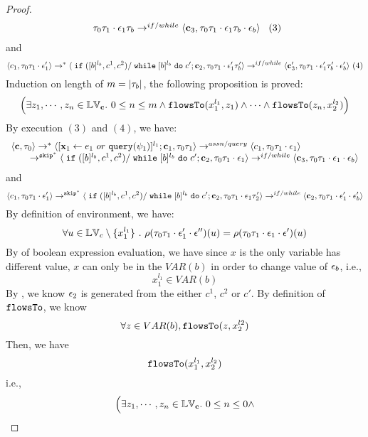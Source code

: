 \begin{proof}
\[\begin{array}{l}
{  \ensuremath{\mathtt{\tau}}_0 \ensuremath{\mathtt{\tau}}_1 \cdot \ensuremath{\mathtt{\epsilon}}_1 \ensuremath{\mathtt{\tau}}_b} 
  \rightarrow^{if / while} 
  \langle {\boldsymbol{\mathbf{c}}}_3,  \mathtt{\tau}_0 \mathtt{\tau}_1 \cdot \mathtt{\epsilon}_1 \mathtt{\tau}_b \cdot \mathtt{\epsilon}_b \rangle 
\end{array} ~ (3)
 \]
and 
 \[
  \langle c_1, \mathtt{\tau}_0 \mathtt{\tau}_1 \cdot \mathtt{\epsilon}_1' \rangle 
  \rightarrow^{*} 
  \langle \;\mathtt{if}\;([b]{}^{l_b}, c^1, c^2) / \;\mathtt{while}\; [b]{}^{l_b} \;\mathtt{do}\; c'; {\boldsymbol{\mathbf{c}}}_2, 
  \mathtt{\tau}_0 \mathtt{\tau}_1 \cdot \mathtt{\epsilon}_1' \mathtt{\tau}_b' \rangle 
  \rightarrow^{if/while} 
  \langle {\boldsymbol{\mathbf{c}}}_3',  \mathtt{\tau}_0 \mathtt{\tau}_1 \cdot \mathtt{\epsilon}_1' \mathtt{\tau}_b' \cdot \mathtt{\epsilon}_b' \rangle 
  ~(4)
 \]
Induction on length of $m = |\mathtt{\tau}_b|$, the following proposition is proved:
%
 \[
 \Big( \exists z_1, \cdots, z_n \in \mathbb{LV}_{{\boldsymbol{\mathbf{c}}}}. ~ 0 \leq n \leq m \land
  \mathtt{flowsTo}(x_1^{l_1}, z_1) 
  \land \cdots \land \mathtt{flowsTo}(z_n, x_2^{l_2}) \Big)
  \]
 By execution $(3)$ and $(4)$, we have:
\[
  \begin{array}{l}   
  \langle {\boldsymbol{\mathbf{c}}}, \mathtt{\tau}_0 \rangle 
  \rightarrow^{*} 
  \langle [\mathrel{ {\boldsymbol{\mathbf{x}}}_1 \leftarrow e_1~ or ~ {\tt query}(\psi_1) }]^{l_1} ; {\boldsymbol{\mathbf{c}}}_1, \mathtt{\tau}_0 \mathtt{\tau}_1 \rangle  \rightarrow^{assn/query}
 \langle c_1, \mathtt{\tau}_0 \mathtt{\tau}_1 \cdot \mathtt{\epsilon}_1 \rangle 
  \\ 
  \qquad \rightarrow^{\mathtt{skip}^*} 
  \langle \;\mathtt{if}\;([b]{}^{l_b}, c^1, c^2) / \;\mathtt{while}\; [b]{}^{l_b} \;\mathtt{do}\; c'; {\boldsymbol{\mathbf{c}}}_2, 
  \mathtt{\tau}_0 \mathtt{\tau}_1 \cdot \mathtt{\epsilon}_1 \rangle 
  \rightarrow^{if / while} 
  \langle {\boldsymbol{\mathbf{c}}}_3,  \mathtt{\tau}_0 \mathtt{\tau}_1 \cdot \mathtt{\epsilon}_1 \cdot \mathtt{\epsilon}_b \rangle 
\end{array}
 \]
and 
 \[
  \langle c_1, \mathtt{\tau}_0 \mathtt{\tau}_1 \cdot \mathtt{\epsilon}_1' \rangle 
  \rightarrow^{\mathtt{skip}^*} 
  \langle \;\mathtt{if}\;([b]{}^{l_b}, c^1, c^2) / \;\mathtt{while}\; [b]{}^{l_b} \;\mathtt{do}\; c'; {\boldsymbol{\mathbf{c}}}_2, 
  \mathtt{\tau}_0 \mathtt{\tau}_1 \cdot \mathtt{\epsilon}_1 \mathtt{\tau}_2' \rangle 
  \rightarrow^{if / while} 
  \langle {\boldsymbol{\mathbf{c}}}_2,  \mathtt{\tau}_0 \mathtt{\tau}_1 \cdot \mathtt{\epsilon}_1' \cdot \mathtt{\epsilon}_b' \rangle 
 \]
 By definition of environment, we have:
\[
  \forall u \in \mathbb{LV}_c \setminus \{x_1^{l_1}\} ~.~
  \rho(\mathtt{\tau}_0 \mathtt{\tau}_1 \cdot \mathtt{\epsilon}_1' \cdot \mathtt{\epsilon}'') (u) =  
  \rho(\mathtt{\tau}_0 \mathtt{\tau}_1 \cdot \mathtt{\epsilon}_1 \cdot \mathtt{\epsilon}') (u)
\]
%
By  of boolean expression evaluation, we have since $x$ is the only variable has different value, $x$ can only be in the $VAR(b)$ in order to change value of $\mathtt{\epsilon}_b$, i.e.,
 \[
  x_1^{l_1} \in VAR(b)
 \]
 By , we know $\mathtt{\epsilon}_2$ is generated from the either $c^1$, $c^2$ or $c'$.
 By definition of $\mathtt{flowsTo}$, we know
 \[
 \forall z \in VAR(b), \mathtt{flowsTo}(z, x_2^{l2})
 \]
 Then, we have
 \[
 \mathtt{flowsTo}(x_1^{l_1}, x_2^{l_2})
 \]
 i.e.,
 \[
 \Big( \exists z_1, \cdots, z_n \in \mathbb{LV}_{{\boldsymbol{\mathbf{c}}}}. ~ 0 \leq n \leq 0 \land
\]
\end{proof}
